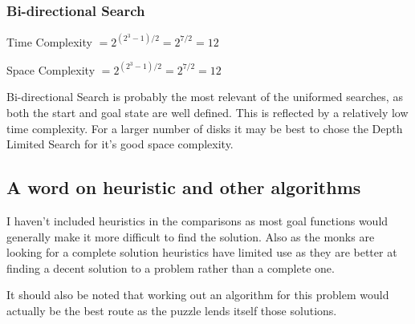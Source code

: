 \documentclass[10pt,letterpaper]{article}
\begin{document}
      \subsubsection{Bi-directional Search}
	Time Complexity \(=2^{(2^3-1)/2} = 2^{7/2} = 12\)
	
	Space Complexity \(=2^{(2^3-1)/2} = 2^{7/2} = 12\)
	
	Bi-directional Search is probably the most relevant of the uniformed searches, as both the start and goal state are well defined. This is reflected by a relatively low time complexity.
	For a larger number of disks it may be best to chose the Depth Limited Search for it's good space complexity.
	
      \subsection{A word on heuristic and other algorithms}
	I haven't included heuristics in the comparisons as most goal functions would generally make it more difficult to find the solution. Also as the monks are looking for a complete solution heuristics have limited use as they are better at finding a decent solution to a problem rather than a complete one.
	
	It should also be noted that working out an algorithm for this problem would actually be the best route as the puzzle lends itself those solutions.
\end{document}
